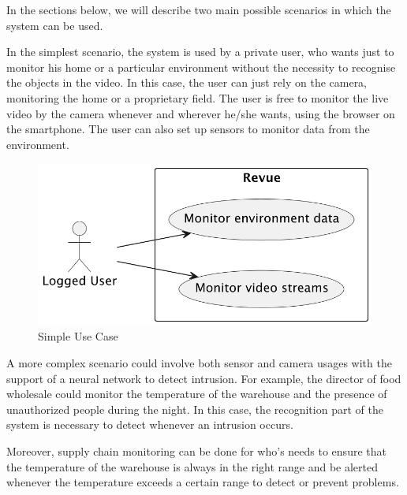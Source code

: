 \documentclass{scrartcl}
\begin{document}
    In the sections below, we will describe two main possible scenarios in which the system can be used.

    In the simplest scenario, the system is used by a private user, who wants just to monitor his home or a particular
    environment without the necessity to recognise the objects in the video.
    In this case, the user can just rely on the camera, monitoring the home or a proprietary field.
    The user is free to monitor the live video by the camera whenever and wherever he/she wants, using the browser on the smartphone.
    The user can also set up sensors to monitor data from the environment.

    \begin{figure}
        \centering
        \includegraphics[scale=0.6]{img/simple-use-case}
        \caption{Simple Use Case}
        \label{fig:simple-use-case}
    \end{figure}

    A more complex scenario could involve both sensor and camera usages with the support of a neural network to detect intrusion.
    For example, the director of food wholesale could monitor the temperature of the warehouse and the presence of unauthorized people during the night.
    In this case, the recognition part of the system is necessary to detect whenever an intrusion occurs.

    Moreover, supply chain monitoring can be done for who's needs to ensure that the temperature of
    the warehouse is always in the right range and be alerted whenever the temperature exceeds a certain range to detect or
    prevent problems.
\end{document}
